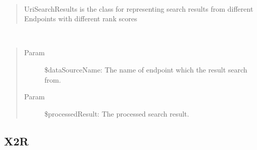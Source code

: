\documentclass[letterpaper,10pt,english]{sphinxmanual}
\begin{document}
\begin{fulllineitems}
\label{docs/api:UriSearchResults}~\begin{quote}

UriSearchResults is the class for representing search results from different Endpoints with different rank scores
\end{quote}

\begin{fulllineitems}
\label{docs/api:UriSearchResults::addOneResult}~\begin{quote}\begin{description}
\item[{Param}] \leavevmode
\$dataSourceName: The name of endpoint which the result search from.

\item[{Param}] \leavevmode
\$processedResult: The processed search result.

\end{description}\end{quote}

\end{fulllineitems}


\end{fulllineitems}



\subsection{X2R}
\label{docs/api:x2r}
\end{document}
